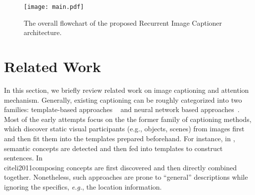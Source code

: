 \documentclass[10pt,twocolumn,letterpaper]{article}
\begin{document}
	
	\begin{figure*}[t]
		\begin{center}
			\texttt{[image: main.pdf]}
		\end{center}
		\caption{The overall flowchart of the proposed Recurrent Image Captioner architecture.
		}
		\label{fig:main}
	\end{figure*}
	
	\section{Related Work}
	In this section, we briefly review related work on image captioning and attention mechanism. Generally, existing captioning can be roughly categorized into two families: template-based approaches ~\cite{elliott2013image, kuznetsova2012collective} and neural network based approaches~\cite{karpathy2015deep,karpathy2014deep,xu2015show}. Most of the early attempts focus on the the former family of captioning methods, which discover static visual participants (e.g., objects, scenes) from images first and then fit them into the templates prepared beforehand. For instance, in \cite{farhadi2010every, kulkarni2011baby}, semantic concepts are detected and then fed into templates to construct sentences. In~\\cite{li2011composing} concepts are first discovered and then directly combined together. Nonetheless, such approaches are prone to ``general'' descriptions while ignoring the specifics, \emph{e.g.}, the location information.
	
\end{document}
